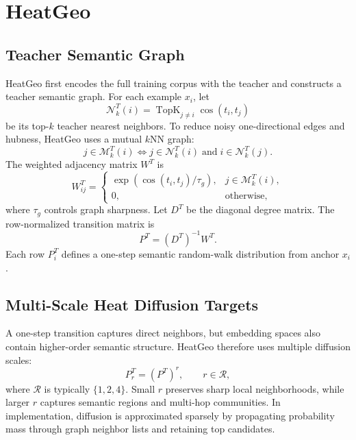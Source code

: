 \section{HeatGeo}
\label{sec:method}

\subsection{Teacher Semantic Graph}

HeatGeo first encodes the full training corpus with the teacher and constructs a teacher semantic graph. For each example $x_i$, let
\begin{equation}
    \mathcal{N}_k^T(i)
    =
    \operatorname{TopK}_{j\neq i}\cos(t_i,t_j)
\end{equation}
be its top-$k$ teacher nearest neighbors. To reduce noisy one-directional edges and hubness, HeatGeo uses a mutual $k$NN graph:
\begin{equation}
    j \in \mathcal{M}_k^T(i)
    \Longleftrightarrow
    j \in \mathcal{N}_k^T(i)
    \;\mathrm{and}\;
    i \in \mathcal{N}_k^T(j).
\end{equation}
The weighted adjacency matrix $W^T$ is
\begin{equation}
    W_{ij}^{T}
    =
    \begin{cases}
    \exp(\cos(t_i,t_j)/\tau_g), & j \in \mathcal{M}_k^T(i),\\
    0, & \mathrm{otherwise},
    \end{cases}
\end{equation}
where $\tau_g$ controls graph sharpness. Let $D^T$ be the diagonal degree matrix. The row-normalized transition matrix is
\begin{equation}
    P^T = (D^T)^{-1}W^T.
\end{equation}
Each row $P_i^T$ defines a one-step semantic random-walk distribution from anchor $x_i$.

\subsection{Multi-Scale Heat Diffusion Targets}

A one-step transition captures direct neighbors, but embedding spaces also contain higher-order semantic structure. HeatGeo therefore uses multiple diffusion scales:
\begin{equation}
    P_r^T = (P^T)^r,
    \qquad r \in \mathcal{R},
\end{equation}
where $\mathcal{R}$ is typically $\{1,2,4\}$. Small $r$ preserves sharp local neighborhoods, while larger $r$ captures semantic regions and multi-hop communities. In implementation, diffusion is approximated sparsely by propagating probability mass through graph neighbor lists and retaining top candidates.

